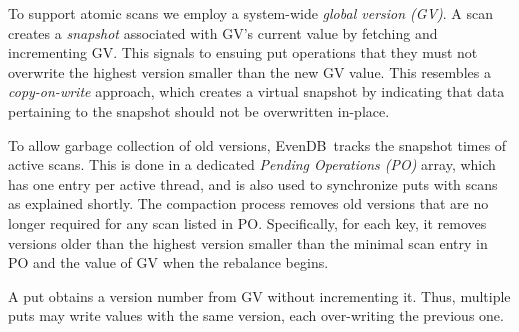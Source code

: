 \documentclass[sigplan,10pt]{acmart}
\newcommand{\remove}[1]{}
\newcommand{\sys}{EvenDB}
\begin{document}
\remove{
We note that using a single pending array to synchronize all operations can cause contention, which we
eliminate in our implementation by tracking the pending puts in per-chunk arrays with per-thread entries as done in~\cite{kiwi}.
}

To support atomic scans we employ a system-wide \emph{global version (GV)}. 
A scan  creates a \emph{snapshot} associated with GV's current value by fetching and incrementing GV.
This signals to ensuing put operations that they must not overwrite the highest
version smaller than the new GV value.
This resembles a \emph{copy-on-write} approach, which  creates a virtual snapshot by 
indicating that data pertaining to the snapshot should not be overwritten in-place.  

To allow garbage collection of old versions, \sys\  tracks the snapshot times of active scans.
This is done in a dedicated  \emph{Pending Operations (PO)} array, which has one entry per active thread,
and is also used to synchronize puts with scans as explained shortly.
The compaction process 
removes old versions that are no longer required for any  
scan listed in PO. Specifically, for each key, it removes versions older than the highest version smaller than the minimal
scan entry in PO and the value of GV when the rebalance begins. 

\remove{
For linearizing (i.e., determining an order on) updates, we associate each KV pair written to the data store 
with a unique-per-key timestamp.
This timestamp is composed as a tuple $\langle$ver, gen, seq$\rangle$, where \emph{ver} is  the version read from GV 
(recall that GV is only incremented upon scans and hence might remain unchanged across multiple puts),
\emph{gen} is the generation of the target chunk's last created munk  (which may or may not still exist), 
and seq is the running sequence number of values inserted to the chunk in the current generation.
}


A put obtains a version number from GV without incrementing it. Thus, multiple puts may write values with the same version, each over-writing the previous one. 
\end{document}

